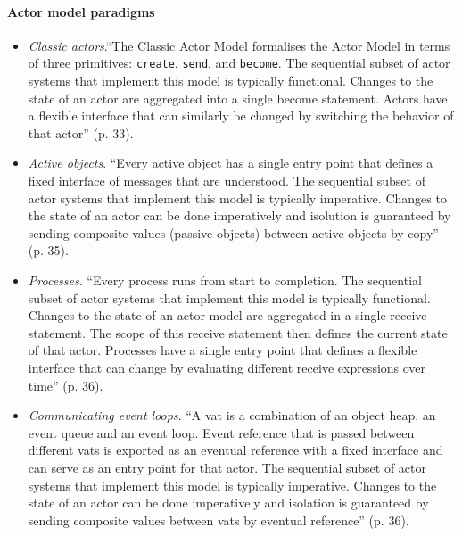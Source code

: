 \paragraph{Actor model paradigms}
\begin{itemize}
\item \emph{Classic actors}.``The Classic Actor Model formalises the Actor Model in terms of three primitives: \texttt{create}, \texttt{send}, and \texttt{become}. The sequential subset of actor systems that implement this model is typically functional. Changes to the state of an actor are aggregated into a single become statement. Actors have a flexible interface that can similarly be changed by switching the behavior of that actor'' (p. 33).
\item \emph{Active objects}. ``Every active object has a single entry point that defines a fixed interface of messages that are understood. The sequential subset of actor systems that implement this model is typically imperative. Changes to the state of an actor can be done imperatively and isolution is guaranteed by sending composite values (passive objects) between active objects by copy'' (p. 35).
\item \emph{Processes}. ``Every process runs from start to completion. The sequential subset of actor systems that implement this model is typically functional. Changes to the state of an actor model are aggregated in a single receive statement. The scope of this receive statement then defines the current state of that actor. Processes have a single entry point that defines a flexible interface that can change by evaluating different receive expressions over time'' (p. 36).
\item \emph{Communicating event loops}. ``A vat is a combination of an object heap, an event queue and an event loop. Event reference that is passed between different vats is exported as an eventual reference with a fixed interface and can serve as an entry point for that actor. The sequential subset of actor systems that implement this model is typically imperative. Changes to the state of an actor can be done imperatively and isolation is guaranteed by sending composite values between vats by eventual reference'' (p. 36).
\end{itemize}

